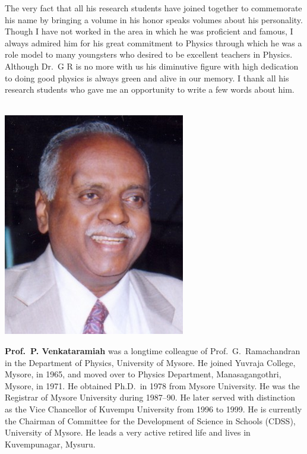The very fact that all his research students have joined together to commemorate his name by bringing a volume in his honor speaks volumes about his personality. Though I have not worked in the area in which he was proficient and famous, I always admired him for his great commitment to Physics through which he was a role model to many youngsters who desired to be excellent teachers in Physics. Although Dr.\ G R is no more with us his diminutive figure with high dedication to doing good physics is always green and alive in our memory. I thank all his research students who gave me an opportunity to write a few words about him.
\medskip

\noindent
\begin{minipage}[t]{2.5cm}%
\phantom{i}\\[-2.8cm]%
\includegraphics[scale=0.9]{authorsphotos/Prof_P_Venkataramaiah.jpg}
\end{minipage}
\begin{minipage}{7.5cm}
\textbf{Prof.\ P. Venkataramiah} was a longtime colleague of Prof.\ G.\ Ramachandran in the Department of Physics, University of Mysore. He joined Yuvraja College, Mysore, in 1965, and moved over to Physics Department, Manasagangothri, Mysore, in 1971. He obtained Ph.D.\ in 1978 from Mysore University. He was the Registrar of Mysore University during 1987--90. He later served with distinction as the Vice Chancellor of Kuvempu University from 1996 to 1999. He is currently the Chairman of Committee for the Development of Science in Schools (CDSS), University of Mysore. He leads a very active retired life and lives in Kuvempunagar, Mysuru.
\end{minipage}

